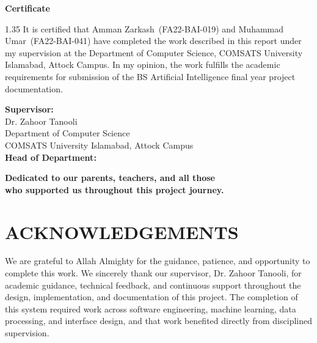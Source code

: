 \documentclass[12pt,a4paper,oneside]{report}
\newcommand{\studentone}{Amman Zarkash}
\newcommand{\studentoneid}{FA22-BAI-019}
\newcommand{\studenttwo}{Muhammad Umar}
\newcommand{\studenttwoid}{FA22-BAI-041}
\newcommand{\supervisorname}{Dr. Zahoor Tanooli}
\begin{document}
\begin{titlepage}
\centering
\vspace*{1cm}
{\LARGE \textbf{Certificate}}\\[1cm]
\begin{spacing}{1.35}
It is certified that \studentone\ (\studentoneid) and \studenttwo\ (\studenttwoid) have completed the work described in this report under my supervision at the Department of Computer Science, COMSATS University Islamabad, Attock Campus. In my opinion, the work fulfills the academic requirements for submission of the BS Artificial Intelligence final year project documentation.
\end{spacing}

\vfill
\begin{flushleft}
\textbf{Supervisor:} \hrulefill\\[0.2cm]
\hspace*{2.6cm}\supervisorname\\
\hspace*{2.6cm}Department of Computer Science\\
\hspace*{2.6cm}COMSATS University Islamabad, Attock Campus\\[0.8cm]
\textbf{Head of Department:} \hrulefill
\end{flushleft}
\end{titlepage}

\begin{titlepage}
\centering
\vspace*{3cm}
{\Large \textbf{Dedicated to our parents, teachers, and all those}\\[0.3cm]
\textbf{who supported us throughout this project journey.}}
\end{titlepage}


\chapter*{ACKNOWLEDGEMENTS}
We are grateful to Allah Almighty for the guidance, patience, and opportunity to complete this work. We sincerely thank our supervisor, \supervisorname, for academic guidance, technical feedback, and continuous support throughout the design, implementation, and documentation of this project. The completion of this system required work across software engineering, machine learning, data processing, and interface design, and that work benefited directly from disciplined supervision.
\end{document}
